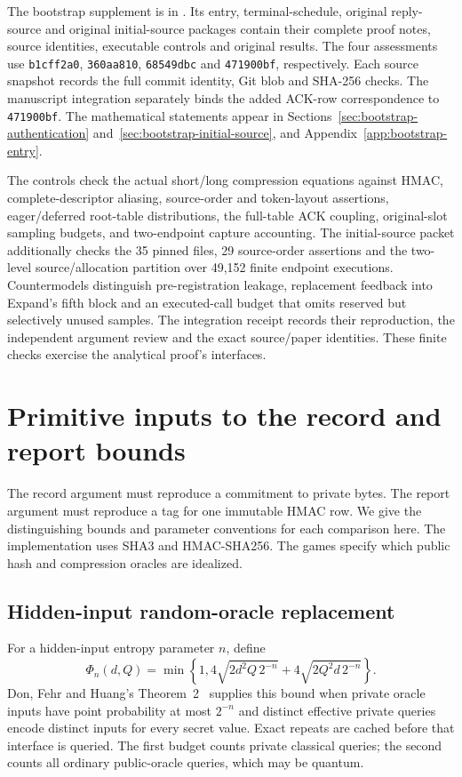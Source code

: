 \documentclass[pdflatex]{sn-jnl}
\theoremstyle{thmstyleone}
\theoremstyle{thmstylethree}
\theoremstyle{thmstyletwo}
\begin{document}
The bootstrap supplement is in .
Its entry, terminal-schedule, original reply-source and original initial-source
packages contain their complete proof notes, source identities, executable controls and original
results. The four assessments use \texttt{b1cff2a0}, \texttt{360aa810},
\texttt{68549dbc} and \texttt{471900bf}, respectively. Each source
snapshot records the full commit identity, Git blob and SHA-256 checks.
The manuscript integration separately binds the added ACK-row correspondence
to \texttt{471900bf}. The mathematical statements appear in
Sections~\ref{sec:bootstrap-authentication}
and~\ref{sec:bootstrap-initial-source}, and
Appendix~\ref{app:bootstrap-entry}.

The controls check the actual short/long compression equations against HMAC,
complete-descriptor aliasing, source-order and token-layout assertions,
eager/deferred root-table distributions, the full-table ACK coupling,
original-slot sampling budgets, and two-endpoint capture accounting.
The initial-source packet additionally checks the 35 pinned files,
29 source-order assertions and the two-level source/allocation partition
over 49,152 finite endpoint executions.
Countermodels distinguish pre-registration leakage, replacement feedback
into Expand's fifth block and an executed-call budget that omits reserved
but selectively unused samples. The integration receipt records their
reproduction, the independent argument review and the exact source/paper
identities. These finite checks exercise the analytical proof's interfaces.
\section{Primitive inputs to the record and report bounds}
\label{app:primitive-inputs}

The record argument must reproduce a commitment to private bytes.
The report argument must reproduce a tag for one immutable HMAC row.
We give the distinguishing bounds and parameter conventions for each
comparison here. The implementation uses SHA3 and HMAC-SHA256. The
games specify which public hash and compression oracles are idealized.

\subsection{Hidden-input random-oracle replacement}

For a hidden-input entropy parameter $n$, define
\[
 \Phi_n(d,Q)=\min\!\left\{1,
 4\sqrt{2d^2Q\,2^{-n}}+4\sqrt{2Q^2d\,2^{-n}}\right\}.
\]
Don, Fehr and Huang's Theorem~2~\cite{dfh2022} supplies this bound when
private oracle inputs have point probability at most $2^{-n}$ and distinct
effective private queries encode distinct inputs for every secret value.
Exact repeats are cached before that interface is queried. The first budget
counts private classical queries; the second counts all ordinary
public-oracle queries, which may be quantum.
\end{document}
